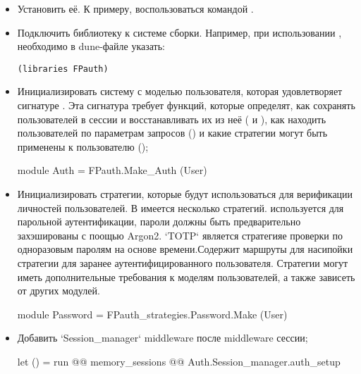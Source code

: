 \begin{itemize}\item{Установить её. К примеру, воспользоваться командой .}%
\item{Подключить библиотеку к системе сборки. Например, при использовании , необходимо в dune-файле указать:

\begin{verbatim}(libraries FPauth)\end{verbatim}%
}\end{itemize}%
\begin{itemize}\item{Инициализировать систему с моделью пользователя, которая удовлетворяет сигнатуре \hyperref[page-FPauth-core-module-FPauth+u+core-module-Auth+u+sign-module-type-MODEL]{}. Эта сигнатура требует функций, которые определят, как сохранять пользователей в сессии и восстанавливать их из неё ( и ), как находить пользователей по параметрам запросов () и какие стратегии могут быть применены к пользователю ();\medbreak
\begin{ocamlcodeblock}
module Auth = FPauth.Make_Auth (User)
\end{ocamlcodeblock}\medbreak
}\end{itemize}%
\begin{itemize}\item{Инициализировать стратегии, которые будут использоваться для верификации личностей пользователей. В \hyperref[page-FPauth-strategies-module-FPauth+u+strategies]{} имеется несколько стратегий.  используется для парольной аутентификации, пароли должны быть предварительно захэшированы с поощью Argon2. `TOTP` является стратегияе проверки по одноразовым паролям на основе времени.Содержит маршруты для насипойки стратегии для заранее аутентифицированного пользователя. Стратегии могут иметь дополнительные требования к моделям пользователей, а также зависеть от других модулей.\medbreak
\begin{ocamlcodeblock}
module Password = FPauth_strategies.Password.Make (User)
\end{ocamlcodeblock}\medbreak
}\end{itemize}%
\begin{itemize}\item{Добавить `Session\_manager` middleware после middleware сессии;\medbreak
\begin{ocamlcodeblock}
let () = run
  @@ memory_sessions
  @@ Auth.Session_manager.auth_setup
\end{ocamlcodeblock}\medbreak
}\end{itemize}%
